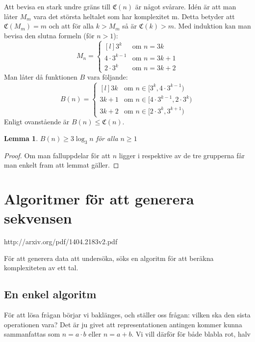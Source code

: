 \documentclass[a4paper,titlepage,draft]{article}
\newcommand{\C}[1]{\mathfrak C \left( #1 \right)}
\newtheorem{lemma}{Lemma}
\begin{document}
    Att bevisa en stark undre gräns till $\C{n}$ är något svårare.
    Idén är att man låter $M_m$ vara det största heltalet som har komplexitet m.
    Detta betyder att $\C{M_m} = m$ och att för alla $k > M_m$ så är $\C{k}>m$.
    Med induktion kan man bevisa den slutna formeln (för $n>1$):
    $$ M_n = \left\{ \begin{matrix*}[l] 3^k & \text{om } n=3k \\
                             4\cdot3^{k-1} & \text{om } n=3k+1 \\
                                 2\cdot3^k & \text{om } n=3k+2 \end{matrix*}
            \right.$$
    Man låter då funktionen $B$ vara följande:
    $$ B(n) = \left\{ \begin{matrix*}[l] 3k & \text{om } n\in[3^k,4\cdot3^{k-1}) \\
                                       3k+1 & \text{om } n\in[4\cdot3^{k-1},2\cdot3^k) \\
                                       3k+2 & \text{om } n\in[2\cdot3^k,3^{k+1}) \end{matrix*}
            \right.$$
    Enligt ovanstående är $B(n)\le\C{n}$.
    \begin{lemma}
        $B(n)\ge 3\log_3 n$ \quad för alla $n\ge1$
    \end{lemma}
    \begin{proof}
       Om man falluppdelar för att $n$ ligger i respektive av de tre grupperna
       får man enkelt fram att lemmat gäller.
    \end{proof}



\section{Algoritmer för att generera sekvensen}

http://arxiv.org/pdf/1404.2183v2.pdf

För att generera data att undersöka, söks en algoritm för att beräkna komplexiteten av ett tal.

\subsection{En enkel algoritm}

För att lösa frågan börjar vi baklänges, och ställer oss frågan: vilken ska den sista operationen vara?
Det är ju givet att representationen antingen kommer kunna sammanfattas som $n = a\cdot b$ eller $n = a+b$.
Vi vill därför för både
blabla rot, halv
\end{document}
